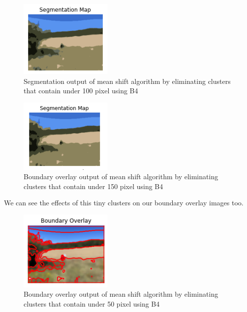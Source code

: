 \documentclass[conference]{IEEEtran}
\begin{document}
\begin{figure}[h]
        \centering
        \includegraphics[width=0.4\textwidth]{resources/2_s.png}
        \caption{Segmentation output of mean shift algorithm by eliminating clusters that contain under 100 pixel using B4}
        \label{fig:2_s}
    \end{figure}

\begin{figure}[h]
        \centering 
        \includegraphics[width=0.4\textwidth]{resources/3_s.png}
        \caption{Boundary overlay output of mean shift algorithm by eliminating clusters that contain under 150 pixel using B4}
        \label{fig:3_s}
    \end{figure}

We can see the effects of this tiny clusters on our boundary overlay images too.

\begin{figure}[h]
        \centering
        \includegraphics[width=0.4\textwidth]{resources/1_b.png}
        \caption{Boundary overlay output of mean shift algorithm by eliminating clusters that contain under 50 pixel using B4}
        \label{fig:1_b}
    \end{figure}
\end{document}
